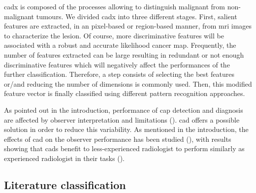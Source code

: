 \Ac{cadx} is composed of the processes allowing to distinguish malignant from non-malignant tumours. We divided \ac{cadx} into three different stages. First, salient features are extracted, in an pixel-based or region-based manner, from \ac{mri} images to characterize the lesion. Of course, more discriminative features will be associated with a robust and accurate likelihood cancer map. Frequently, the number of features extracted can be large resulting in redundant or not enough discriminative features which will negatively affect the performances of the further classification. Therefore, a step consists of selecting the best features or/and reducing the number of dimensions is commonly used. Then, this modified feature vector is finally classified using different pattern recognition approaches.

As pointed out in the introduction, performance of \ac{cap} detection and diagnosis are affected by observer interpretation and limitations (\cite{Giger2008,Hambrock2013}). \ac{cad} offers a possible solution in order to reduce this variability. As mentioned in the introduction, the effects of \ac{cad} on the observer performance has been studied (\cite{Hambrock2013}), with results showing that \acp{cad} benefit to less-experienced radiologist to perform similarly as experienced radiologist in their tasks (\cite{Hambrock2013}). 


\subsection{Literature classification}


